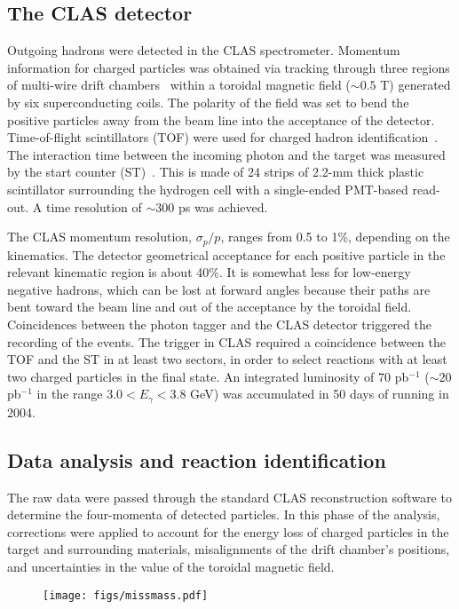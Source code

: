 \documentclass[twocolumn,superscriptaddress,prd]{revtex4}
\begin{document}
\subsection{The CLAS detector}
Outgoing  hadrons were detected in the CLAS  spectrometer.
Momentum information for charged particles was obtained via tracking
through three regions of multi-wire drift chambers~\cite{DC} within  a toroidal magnetic 
field ($\sim 0.5$ T) generated by six superconducting coils. 
The polarity of the field was set to bend the positive particles away from the beam line  into the acceptance 
of the  detector.
Time-of-flight scintillators (TOF) were used for charged hadron
identification~\cite{Sm99}. 
The interaction time between the incoming photon and the target
was measured by  the start counter (ST)~\cite{ST}. This   is
made of 24 strips of 2.2-mm thick plastic scintillator surrounding the hydrogen cell
with a single-ended PMT-based read-out. 
A time resolution of $\sim$300 ps  was achieved.

The CLAS momentum resolution, $\sigma_p/p$, ranges from 0.5 to 1\%, depending on
the kinematics. 
The detector geometrical acceptance for each positive particle in the 
relevant kinematic region is about 40\%. It is somewhat less for low-energy negative 
hadrons, which can be lost at  forward angles because
their paths are bent toward the beam line and out of the acceptance
by the toroidal field.
Coincidences between the photon tagger and the CLAS detector triggered 
the recording of the events. The trigger in CLAS  required
a coincidence between the TOF and the ST 
in at least two sectors, in order to  select
reactions with at least two charged particles in the final state.
An integrated luminosity of 70 pb$^{-1}$ ($\sim20$ pb$^{-1}$ in the range 3.0$<E_\gamma<$3.8 GeV)
was accumulated in  50 days of running  in 2004. 


\subsection{Data analysis and reaction identification}\label{ssec:reac_id}
The raw data were passed through the standard CLAS reconstruction software to determine the four-momenta of detected particles.
In this phase of the analysis, corrections were applied to account for the energy loss of charged particles in the target and 
surrounding  materials, misalignments of the  drift chamber's positions, and 
uncertainties in the value of the toroidal magnetic field.\\
\begin{figure}[h!] 
\center
\texttt{[image: figs/missmass.pdf]} 
\caption{\label{fig:pid}}
\end{figure}
\end{document}
